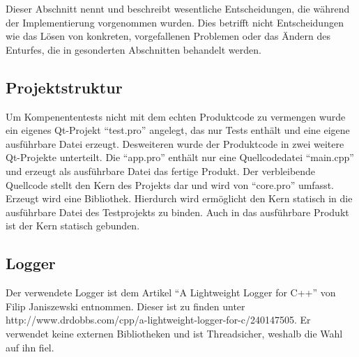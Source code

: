 Dieser Abschnitt nennt und beschreibt wesentliche Entscheidungen, die während der Implementierung vorgenommen wurden. Dies betrifft nicht Entscheidungen wie das Lösen von konkreten, vorgefallenen Problemen oder das Ändern des Enturfes, die in gesonderten Abschnitten behandelt werden.

\subsection{Projektstruktur}
Um Kompenententests nicht mit dem echten Produktcode zu vermengen wurde ein eigenes Qt-Projekt \enquote{test.pro}
angelegt, das nur Tests enthält und eine eigene ausführbare Datei erzeugt. Desweiteren wurde der Produktcode in zwei weitere Qt-Projekte unterteilt. Die \enquote{app.pro} enthält nur eine Quellcodedatei \enquote{main.cpp} und erzeugt als ausführbare Datei das fertige Produkt. Der verbleibende Quellcode stellt den Kern des Projekts dar und wird von \enquote{core.pro} umfasst. Erzeugt wird eine Bibliothek. Hierdurch wird ermöglicht den Kern statisch in die ausführbare Datei des Testprojekts zu binden. Auch in das ausführbare Produkt ist der Kern statisch gebunden.

\subsection{Logger}
Der verwendete Logger ist dem Artikel \enquote{A Lightweight Logger for C++} von Filip Janiszewski entnommen.
Dieser ist zu finden unter http://www.drdobbs.com/cpp/a-lightweight-logger-for-c/240147505.
Er verwendet keine externen Bibliotheken und ist Threadsicher, weshalb die Wahl auf ihn fiel.
